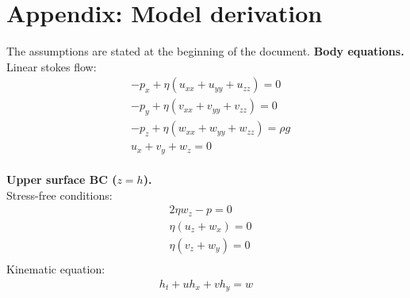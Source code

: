 \documentclass[paper=a4, fontsize=11pt]{article}
\begin{document}
\newpage

\section*{Appendix: Model derivation}
The assumptions are stated at the beginning of the document.
\noindent\textbf{Body equations.}\\
Linear stokes flow:
\begin{align}
&-p_x + \eta ( u_{xx} +u_{yy} + u_{zz}) = 0  \\
&-p_y + \eta ( v_{xx}+v_{yy} + v_{zz}) = 0 \\
&-p_z + \eta ( w_{xx} +w_{yy} + w_{zz}) = \rho g \\
&u_x + v_y + w_z = 0
\end{align}
\\
\noindent\textbf{Upper surface BC ($z=h$).}\\
Stress-free conditions:
\begin{align}
&2\eta w_z - p = 0 \\
&\eta(u_z +w_x) = 0 \\
&\eta(v_z +w_y) = 0 \\
\end{align}
Kinematic equation:
\begin{align}
h_t + uh_x + vh_y = w
\end{align}
\end{document}
